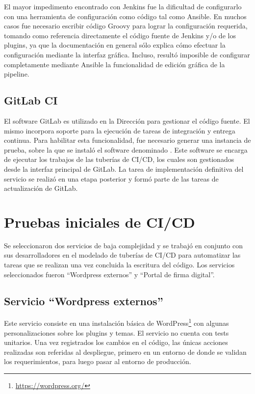 El mayor impedimento encontrado con Jenkins fue la dificultad de
configurarlo con una herramienta de configuración como código tal como
Ansible. En muchos casos fue necesario escribir código Groovy para
lograr la configuración requerida, tomando como referencia
directamente el código fuente de Jenkins y/o de los plugins, ya que la
documentación en general sólo explica cómo efectuar la configuración
mediante la interfaz gráfica. Incluso, resultó imposible de configurar
completamente mediante Ansible la funcionalidad de edición gráfica de
la pipeline.
%
\subsection{GitLab CI}
%
El software GitLab es utilizado en la Dirección para gestionar el
código fuente. El mismo incorpora soporte para la ejecución de tareas
de integración y entrega continua. Para habilitar esta funcionalidad,
fue necesario generar una instancia de prueba, sobre la que se instaló
el software denominado . Este software se encarga de
ejecutar los trabajos de las tuberías de CI/CD, los cuales son
gestionados desde la interfaz principal de GitLab. La tarea de
implementación definitiva del servicio  se realizó en
una etapa posterior y formó parte de las tareas de actualización de
GitLab.
%
%
\section{Pruebas iniciales de CI/CD}
%
Se seleccionaron dos servicios de baja complejidad y se trabajó en
conjunto con sus desarrolladores en el modelado de tuberías de CI/CD
para automatizar las tareas que se realizan una vez concluida la
escritura del código. Los servicios seleccionados fueron ``Wordpress
externos'' y ``Portal de firma digital''.
%
\subsection{Servicio ``Wordpress externos''}
%
Este servicio consiste en una instalación básica de
WordPress\footnote{\url{https://wordpress.org/}} con algunas
personalizaciones sobre los plugins y temas. El servicio no cuenta con
tests unitarios. Una vez registrados los cambios en el código, las
únicas acciones realizadas son referidas al despliegue, primero en un
entorno de  donde se validan los requerimientos, para luego
pasar al entorno de producción.

